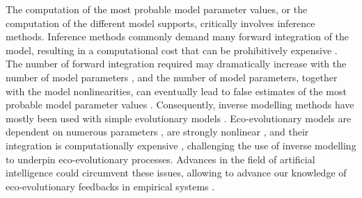 The computation of the most probable model parameter values, or the computation of the different model supports, critically involves inference methods. %
% 
Inference methods commonly demand many forward integration of the model, resulting in a computational cost that can be prohibitively expensive \citep{Schneider2017}.
% 
The number of forward integration required may dramatically increase with the number of model parameters \citep{Csillery2010}, and the number of model parameters, together with the model nonlinearities, can eventually lead to false estimates of the most probable model parameter values \xxx.
% 
% 
Consequently, inverse modelling methods have mostly been used with simple evolutionary models \citep{Csillery2010}. 
% 
Eco-evolutionary models are dependent on numerous parameters \citep{Boyd2012}, are strongly nonlinear \citep{Hastings1993,Huisman1999,Beninca2008}, and their integration is computationally expensive \citep{Fisher2018}, challenging the use of inverse modelling to underpin eco-evolutionary processes. 
% 
Advances in the field of artificial intelligence could circumvent these issues, allowing to advance our knowledge of eco-evolutionary feedbacks in empirical systems \xxx.  
% 
% 
% 
% 


